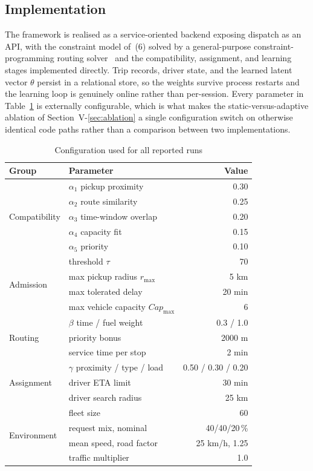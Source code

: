 \documentclass[conference]{IEEEtran}
\begin{document}
\subsection{Implementation}
The framework is realised as a service-oriented backend exposing dispatch as
an API, with the constraint model of~(6) solved by a general-purpose
constraint-programming routing solver~\cite{ortools} and the compatibility, assignment, and
learning stages implemented directly. Trip records, driver state, and the
learned latent vector $\theta$ persist in a relational store, so the weights
survive process restarts and the learning loop is genuinely online rather
than per-session. Every parameter in Table~\ref{tab:config} is
externally configurable, which is what makes the static-versus-adaptive
ablation of Section~V-\ref{sec:ablation} a single configuration switch on
otherwise identical code paths rather than a comparison between two
implementations.

\begin{table}[t]
\caption{Configuration used for all reported runs}
\label{tab:config}
\centering
\footnotesize
\setlength{\tabcolsep}{4pt}
\begin{tabular}{@{}llr@{}}
\toprule
Group & Parameter & Value \\
\midrule
\multirow{5}{*}{Compatibility}
 & $\alpha_1$ pickup proximity      & 0.30 \\
 & $\alpha_2$ route similarity      & 0.25 \\
 & $\alpha_3$ time-window overlap   & 0.20 \\
 & $\alpha_4$ capacity fit          & 0.15 \\
 & $\alpha_5$ priority              & 0.10 \\
\midrule
\multirow{4}{*}{Admission}
 & threshold $\tau$                 & 70 \\
 & max pickup radius $r_{\max}$     & 5 km \\
 & max tolerated delay              & 20 min \\
 & max vehicle capacity $Cap_{\max}$ & 6 \\
\midrule
\multirow{3}{*}{Routing}
 & $\beta$ time / fuel weight       & 0.3 / 1.0 \\
 & priority bonus                   & 2000 m \\
 & service time per stop            & 2 min \\
\midrule
\multirow{3}{*}{Assignment}
 & $\gamma$ proximity / type / load & 0.50 / 0.30 / 0.20 \\
 & driver ETA limit                 & 30 min \\
 & driver search radius             & 25 km \\
\midrule
\multirow{4}{*}{Environment}
 & fleet size                       & 60 \\
 & request mix, nominal             & 40/40/20\,\% \\
 & mean speed, road factor          & 25 km/h, 1.25 \\
 & traffic multiplier               & 1.0 \\
\bottomrule
\end{tabular}
\end{table}
\end{document}
